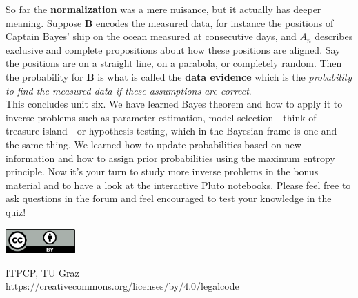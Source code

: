 \documentclass[12pt, a4paper]{scrartcl}
\begin{document}
So far the \textbf{normalization} was a mere nuisance, but it actually has deeper
meaning. Suppose $\boldsymbol{B}$ encodes the measured data, for instance the positions of
Captain Bayes’ ship on the ocean measured at consecutive days, and $A_n$
describes exclusive and complete propositions about how these positions are
aligned. Say the positions are on a straight line, on a parabola, or completely
random. Then the probability for $\boldsymbol{B}$ is what is called the \textbf{data evidence} which is the
\textit{probability to find the measured data if these assumptions are correct}.\\


This concludes unit six. We have learned Bayes theorem and how to apply
it to inverse problems such as parameter estimation, model selection - think of 
treasure island - or hypothesis testing, which in the Bayesian frame is one
and the same thing.
We learned how to update probabilities based on new information and how
to assign prior probabilities using the maximum entropy principle.
Now it’s your turn to study more inverse problems in the bonus material and
to have a look at the interactive Pluto notebooks.
Please feel free to ask questions in the forum and feel encouraged to test your
knowledge in the quiz!


\vspace{2cm}
\begin{minipage}[t]{1\textwidth}
	\raggedleft
	\centering
	\includegraphics[width = 0.20\textwidth]{CC-BY_icon}
	\vspace{0.2cm}
	
	\centering
	{\large ITPCP, TU Graz} \\
	https://creativecommons.org/licenses/by/4.0/legalcode
\end{minipage}
\end{document}
